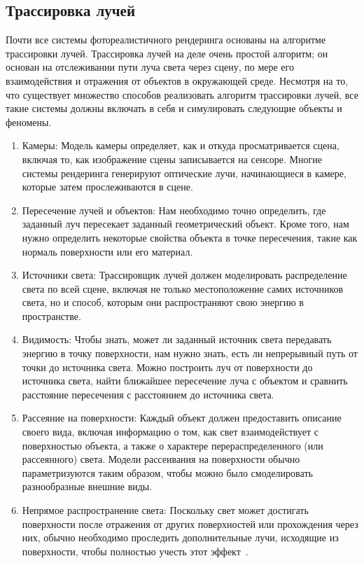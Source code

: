\subsection{Трассировка лучей}
Почти все системы фотореалистичного рендеринга основаны на алгоритме трассировки лучей. 
Трассировка лучей на деле очень простой алгоритм; он основан на отслеживании пути луча света 
через сцену, по мере его взаимодействия и отражения от объектов в окружающей среде.
Несмотря на то, что существует множество способов реализовать алгоритм трассировки лучей, 
все такие системы должны включать в себя и симулировать следующие объекты и феномены.

\begin{enumerate}[label*=---]
    \item Камеры: Модель камеры определяет, как и откуда просматривается сцена, включая то, как 
        изображение сцены записывается на сенсоре. Многие системы рендеринга генерируют оптические 
        лучи, начинающиеся в камере, которые затем прослеживаются в сцене.

    \item Пересечение лучей и объектов: Нам необходимо точно определить, где заданный луч пересекает 
        заданный геометрический объект. Кроме того, нам нужно определить некоторые свойства объекта 
        в точке пересечения, такие как нормаль поверхности или его материал. 

    \item Источники света: Трассировщик лучей 
        должен моделировать распределение света по всей сцене, включая не только местоположение 
        самих источников света, но и способ, которым они распространяют свою энергию в пространстве.

    \item Видимость: Чтобы знать, может ли заданный источник света передавать энергию в точку 
        поверхности, нам нужно знать, есть ли непрерывный путь от точки до источника света. 
        Можно построить луч от поверхности до источника света, найти ближайшее пересечение луча
        с объектом и сравнить расстояние пересечения с расстоянием до источника света.

    \item Рассеяние на поверхности: Каждый объект должен предоставить описание своего вида, 
        включая информацию о том, как свет взаимодействует с поверхностью объекта, а также о
        характере перераспределенного (или рассеянного) света. Модели рассеивания на поверхности 
        обычно параметризуются таким образом, чтобы можно было смоделировать разнообразные внешние виды.

    \item Непрямое распространение света: Поскольку свет может достигать поверхности после отражения 
        от других поверхностей или прохождения через них, обычно необходимо проследить дополнительные 
        лучи, исходящие из поверхности, чтобы полностью учесть этот эффект~\cite{PBRT3e}.
\end{enumerate}

